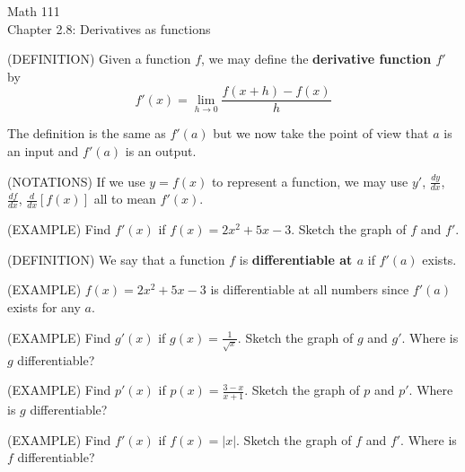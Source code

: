 \documentclass[11pt]{article}
\begin{document}
\begin{center}
\Large
\rm{Math 111}
\\
\rm{Chapter 2.8:  Derivatives as functions}
\\
\end{center}
\vspace{0.2in}

(DEFINITION) Given a function $f$, we may define the {\bf derivative function $f'$} by
\begin{displaymath}
f'(x) = \lim_{h\to 0} \frac{f(x+h)-f(x)}{h}
  \end{displaymath}


\vspace{0.1in}

The definition is the same as $f'(a)$ but we now take the point of view that $a$ is an input and $f'(a)$ is an output. \\

\vspace{0.1in}

(NOTATIONS) If we use $y=f(x)$ to represent a function, we may use $y'$, $\frac{dy}{dx}$, $\frac{df}{dx}$, $\frac{d}{dx}[f(x)]$ all to mean $f'(x)$.

\vspace{0.2in}

(EXAMPLE)  Find $f'(x)$ if $f(x) = 2x^2+5x-3$.  Sketch the graph of $f$ and $f'$.

\vspace{4.5in}

(DEFINITION)  We say that a function $f$ is {\bf differentiable at $a$} if $f'(a)$ exists.  

\vspace{0.2in}

(EXAMPLE)  $f(x) = 2x^2+5x-3$ is differentiable at all numbers since $f'(a)$ exists for any $a$.

\pagebreak

(EXAMPLE)  Find $g'(x)$ if $g(x) = \frac{1}{\sqrt{x}}$.  Sketch the graph of $g$ and $g'$.  Where is $g$ differentiable?


\vspace{3.5in}

(EXAMPLE)  Find $p'(x)$ if $p(x) = \frac{3-x}{x+1}$.  Sketch the graph of $p$ and $p'$. Where is $g$ differentiable?


\pagebreak

(EXAMPLE)  Find $f'(x)$ if $f(x) = |x|$.  Sketch the graph of $f$ and $f'$. Where is $f$ differentiable?

\vspace{3.5in}
\end{document}

